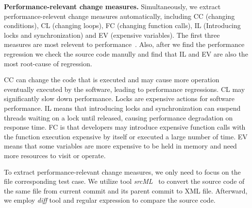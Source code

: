 \textbf{Performance-relevant change measures.} Simultaneously, we extract performance-relevent change measures automatically, including CC (changing conditions), CL (changing loops), FC (changing function calls), IL (Introducing locks and synchronization) and EV (expensive variables). The first three measures are most relevent to performance~\cite{ACM2016:Luo}. Also, after we find the performance regression we check the source code manully and find that IL and EV are also the most root-cause of regression. 

CC can change the code that is executed and may cause more operation eventually executed by the software, leading to performance regressions. CL may significantly slow down performance. Locks are expensive actions for software performance. IL means that introducing locks and synchronization can suspend threads waiting on a lock until released, causing performance degradation on response time. FC is that developers may introduce expensive function calls with the function execution expensive by itself or executed a large number of time. EV means that some variables are more expensive to be held in memory and need more resources to visit or operate. 

To extract performance-relevant change measures, we only need to focus on the file corresponding test case. We utilize tool \emph{srcML}~\cite{srcml_2017} to convert the source code of the same file from current commit and its parent commit to XML file. Afterward, we employ \emph{diff} tool and regular expression to compare the source code.

